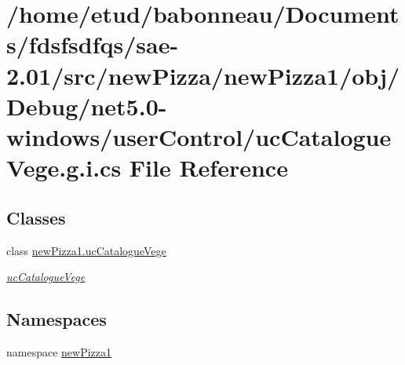 \hypertarget{net5_80-windows_2userControl_2ucCatalogueVege_8g_8i_8cs}{}\section{/home/etud/babonneau/\+Documents/fdsfsdfqs/sae-\/2.01/src/new\+Pizza/new\+Pizza1/obj/\+Debug/net5.0-\/windows/user\+Control/uc\+Catalogue\+Vege.g.\+i.\+cs File Reference}
\label{net5_80-windows_2userControl_2ucCatalogueVege_8g_8i_8cs}
\subsection*{Classes}
\begin{DoxyCompactItemize}
\item 
class \hyperlink{classnewPizza1_1_1ucCatalogueVege}{new\+Pizza1.\+uc\+Catalogue\+Vege}
\begin{DoxyCompactList}\small\item\em \hyperlink{classnewPizza1_1_1ucCatalogueVege}{uc\+Catalogue\+Vege} \end{DoxyCompactList}\end{DoxyCompactItemize}
\subsection*{Namespaces}
\begin{DoxyCompactItemize}
\item 
namespace \hyperlink{namespacenewPizza1}{new\+Pizza1}
\end{DoxyCompactItemize}
